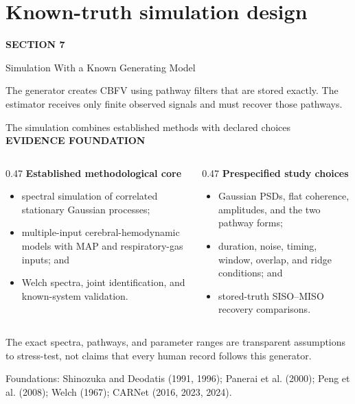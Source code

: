 \documentclass[aspectratio=169,11pt]{beamer}
\newcommand{\sectionlabel}[1]{%
  {\color{Accent}\fontsize{8}{9.5}\selectfont\bfseries\MakeUppercase{#1}}\par\vspace{0.12cm}}
\newcommand{\sourcefooter}[1]{%
  \par\vfill{\color{Muted}\fontsize{6.8}{8}\selectfont #1}}
\newcommand{\sectionframe}[3]{%
  \begin{frame}[plain]
    \vspace{0.7cm}
    {\color{Accent}\fontsize{10}{12}\selectfont\bfseries SECTION #1}\par\vspace{0.45cm}
    {\color{Ink}\fontsize{24.5}{28}\selectfont #2}\par\vspace{0.55cm}
    {\color{Body}\fontsize{14.5}{19}\selectfont #3}
  \end{frame}}
\begin{document}

\section{Known-truth simulation design}
\sectionframe{7}{Simulation With a Known Generating Model}{%
The generator creates CBFV using pathway filters that are stored exactly. The
estimator receives only finite observed signals and must recover those pathways.}

\begin{frame}{The simulation combines established methods with declared choices}
\sectionlabel{Evidence Foundation}
\fontsize{9.4}{11.6}\selectfont
\begin{columns}[T,onlytextwidth]
\begin{column}{0.47\textwidth}
\textbf{Established methodological core}
\begin{itemize}
  \item spectral simulation of correlated stationary Gaussian processes;
  \item multiple-input cerebral-hemodynamic models with MAP and respiratory-gas inputs; and
  \item Welch spectra, joint identification, and known-system validation.
\end{itemize}
\end{column}
\begin{column}{0.47\textwidth}
\textbf{Prespecified study choices}
\begin{itemize}
  \item Gaussian PSDs, flat coherence, amplitudes, and the two pathway forms;
  \item duration, noise, timing, window, overlap, and ridge conditions; and
  \item stored-truth SISO--MISO recovery comparisons.
\end{itemize}
\end{column}
\end{columns}

\vspace{0.08cm}
The exact spectra, pathways, and parameter ranges are transparent assumptions
to stress-test, not claims that every human record follows this generator.
\sourcefooter{Foundations: Shinozuka and Deodatis (1991, 1996); Panerai et al. (2000); Peng et al. (2008); Welch (1967); CARNet (2016, 2023, 2024).}
\end{frame}
\end{document}
